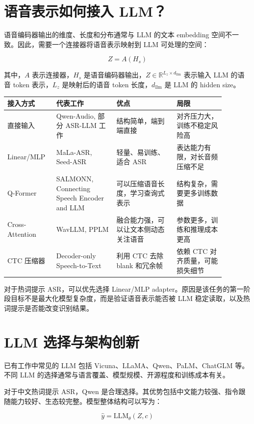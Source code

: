 \documentclass[UTF8,fontset=fandol]{ctexart}
\begin{document}
\section{语音表示如何接入 LLM？}

语音编码器输出的维度、长度和分布通常与 LLM 的文本 embedding 空间不一致。因此，需要一个连接器将语音表示映射到 LLM 可处理的空间：

$$
Z = A(H_s)
$$

其中，$A$ 表示连接器，$H_s$ 是语音编码器输出，$Z \in \mathbb{R}^{L_z \times d_{\text{llm}}}$ 表示输入 LLM 的语音 token 表示，$L_z$ 是映射后的语音 token 长度，$d_{\text{llm}}$ 是 LLM 的 hidden size。

\begin{longtable}{p{0.18\linewidth}p{0.25\linewidth}p{0.25\linewidth}p{0.2\linewidth}}
\toprule
接入方式 & 代表工作 & 优点 & 局限 \\
\midrule
直接输入 & Qwen-Audio, 部分 ASR-LLM 工作 & 结构简单，端到端直接 & 对齐压力大，训练不稳定风险高 \\
\midrule
Linear/MLP & MaLa-ASR, Seed-ASR & 轻量、易训练、适合 ASR & 表达能力有限，对长音频压缩不足 \\
\midrule
Q-Former & SALMONN, Connecting Speech Encoder and LLM & 可以压缩语音长度，学习查询式表示 & 结构复杂，需要更多训练数据 \\
\midrule
Cross-Attention & WavLLM, PPLM & 融合能力强，可以让文本侧动态关注语音 & 参数更多，训练和推理成本更高 \\
\midrule
CTC 压缩器 & Decoder-only Speech-to-Text & 利用 CTC 去除 blank 和冗余帧 & 依赖 CTC 对齐质量，可能损失细节 \\
\bottomrule
\end{longtable}

对于热词提示 ASR，可以优先选择 Linear/MLP adapter。原因是该任务的第一阶段目标不是最大化模型复杂度，而是验证语音表示能否被 LLM 稳定读取，以及热词提示是否能改变识别结果。

\section{LLM 选择与架构创新}

已有工作中常见的 LLM 包括 Vicuna、LLaMA、Qwen、PaLM、ChatGLM 等。不同 LLM 的选择通常与语言覆盖、模型规模、开源程度和训练成本有关。

对于中文热词提示 ASR，Qwen 是合理选择。其优势包括中文能力较强、指令跟随能力较好、生态较完整。模型整体结构可以写为：

$$
\hat{y} = \mathrm{LLM}_{\theta}(Z, c)
$$
\end{document}
